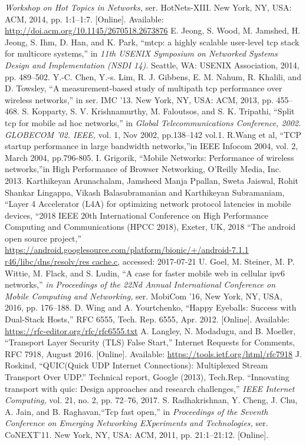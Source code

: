 \begin{multicols}{2}
{{{{{{{\begin{thebibliography}{99}
\textit{Workshop on Hot Topics in Networks,} ser. HotNets-XIII. New York, NY, USA: ACM, 2014, pp. 1:1–1:7. [Online]. Available: \url{http://doi.acm.org/10.1145/2670518.2673876}
 E. Jeong, S. Wood, M. Jamshed, H. Jeong, S. Ihm, D. Han, and K. Park, “mtcp: a highly scalable user-level tcp stack for multicore systems,” in \textit{11th USENIX Symposium on Networked Systems Design and Implementation (NSDI 14).} Seattle, WA: USENIX Association, 2014, pp. 489–502.
 Y.-C. Chen, Y.-s. Lim, R. J. Gibbens, E. M. Nahum, R. Khalili, and D. Towsley, “A measurement-based study of multipath tcp performance over wireless networks,” in  ser. IMC ’13. New York, NY, USA: ACM, 2013, pp. 455–468.
 S. Kopparty, S. V. Krishnamurthy, M. Faloutsos, and S. K. Tripathi, “Split tcp for mobile ad hoc networks,” in \textit{Global Telecommunications Conference, 2002. GLOBECOM ’02. IEEE,} vol. 1, Nov 2002, pp.138–142 vol.1.
 R.Wang et al, “TCP startup performance in large bandwidth networks,”in IEEE Infocom 2004, vol. 2, March 2004, pp.796-805.
 I. Grigorik, “Mobile Networks: Performance of wireless networks,”in High Performance of Browser Networking, O’Reilly Media, Inc. 2013.
 Karthikeyan Arunachalam, Jamsheed Manja Ppallan, Sweta Jaiswal, Rohit Shankar Lingappa, Vikash Balasubramanian and Karthikeyan Subramaniam, “Layer 4 Accelerator (L4A) for optimizing network protocol latencies in mobile devices, “2018 IEEE 20th International Conference on High Performance Computing and Communications (HPCC 2018), Exeter, UK, 2018
 “The android open source project,” \url{https://android.googlesource.com/platform/bionic/+/android-7.1.1 r46/libc/dns/resolv/res cache.c,} accessed: 2017-07-21
 U. Goel, M. Steiner, M. P. Wittie, M. Flack, and S. Ludin, “A case for faster mobile web in cellular ipv6 networks,” \textit{in Proceedings of the 22Nd Annual International Conference on Mobile Computing and Networking,} ser. MobiCom ’16, New York, NY, USA, 2016, pp. 176–188.
 D. Wing and A. Yourtchenko, “Happy Eyeballs: Success with Dual-Stack Hosts,” RFC 6555, Tech. Rep. 6555, Apr. 2012. [Online]. Available: \url{https://rfc-editor.org/rfc/rfc6555.txt}
 A. Langley, N. Modadugu, and B. Moeller, “Transport Layer Security (TLS) False Start,” Internet Requests for Comments, RFC 7918, August 2016. [Online]. Available: \url{https://tools.ietf.org/html/rfc7918}
 J. Roskind, “QUIC(Quick UDP Internet Connections): Multiplexed Stream Transport Over UDP.” Technical report, Google (2013), Tech.Rep.
 “Innovating transport with quic: Design approaches and research challenges,” \textit{IEEE Internet Computing,} vol. 21, no. 2, pp. 72–76, 2017.
 S. Radhakrishnan, Y. Cheng, J. Chu, A. Jain, and B. Raghavan,“Tcp fast open,” in \textit{Proceedings of the Seventh Conference on Emerging Networking EXperiments and Technologies,} ser. CoNEXT’11. New York, NY, USA: ACM, 2011, pp. 21:1–21:12. [Online].


\end{thebibliography}}}}}}}}
\end{multicols}
